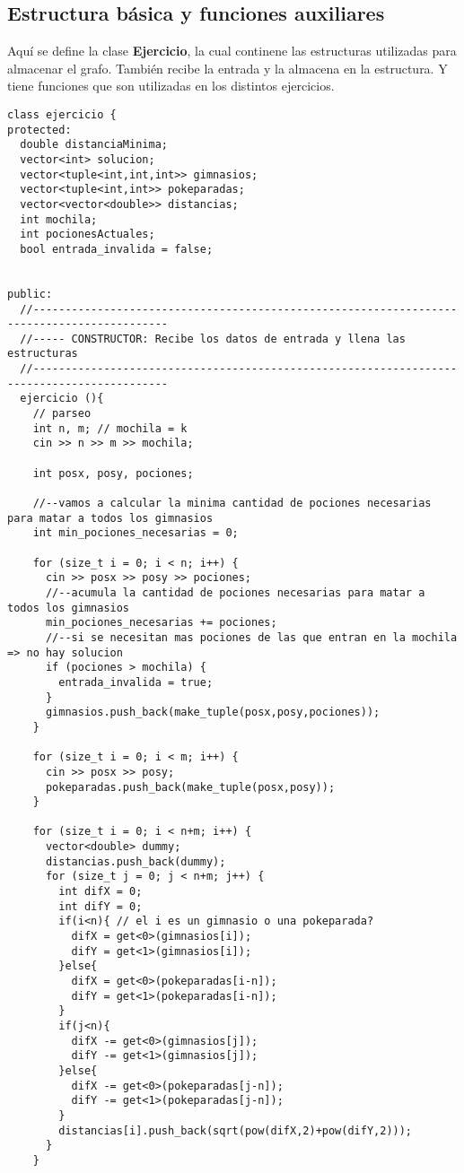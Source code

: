 \subsection{Estructura básica y funciones auxiliares}
\label{sec: anexo_ejercicio}
\par Aquí se define la clase \textbf{Ejercicio}, la cual continene las estructuras utilizadas para almacenar el grafo. También recibe la entrada y la almacena en la estructura. Y tiene funciones que son utilizadas en los distintos ejercicios.

\begin{lstlisting}
class ejercicio {
protected:
  double distanciaMinima;
  vector<int> solucion;
  vector<tuple<int,int,int>> gimnasios;
  vector<tuple<int,int>> pokeparadas;
  vector<vector<double>> distancias;
  int mochila;
  int pocionesActuales;
  bool entrada_invalida = false;


public:
  //-------------------------------------------------------------------------------------------
  //----- CONSTRUCTOR: Recibe los datos de entrada y llena las estructuras
  //-------------------------------------------------------------------------------------------
  ejercicio (){
    // parseo
    int n, m; // mochila = k
    cin >> n >> m >> mochila;

    int posx, posy, pociones;

    //--vamos a calcular la minima cantidad de pociones necesarias para matar a todos los gimnasios
    int min_pociones_necesarias = 0;

    for (size_t i = 0; i < n; i++) {
      cin >> posx >> posy >> pociones;
      //--acumula la cantidad de pociones necesarias para matar a todos los gimnasios
      min_pociones_necesarias += pociones;
      //--si se necesitan mas pociones de las que entran en la mochila => no hay solucion
      if (pociones > mochila) {
        entrada_invalida = true;
      }
      gimnasios.push_back(make_tuple(posx,posy,pociones));
    }

    for (size_t i = 0; i < m; i++) {
      cin >> posx >> posy;
      pokeparadas.push_back(make_tuple(posx,posy));
    }

    for (size_t i = 0; i < n+m; i++) {
      vector<double> dummy;
      distancias.push_back(dummy);
      for (size_t j = 0; j < n+m; j++) {
        int difX = 0;
        int difY = 0;
        if(i<n){ // el i es un gimnasio o una pokeparada?
          difX = get<0>(gimnasios[i]);
          difY = get<1>(gimnasios[i]);
        }else{
          difX = get<0>(pokeparadas[i-n]);
          difY = get<1>(pokeparadas[i-n]);
        }
        if(j<n){
          difX -= get<0>(gimnasios[j]);
          difY -= get<1>(gimnasios[j]);
        }else{
          difX -= get<0>(pokeparadas[j-n]);
          difY -= get<1>(pokeparadas[j-n]);
        }
        distancias[i].push_back(sqrt(pow(difX,2)+pow(difY,2)));
      }
    }


\end{lstlisting}
